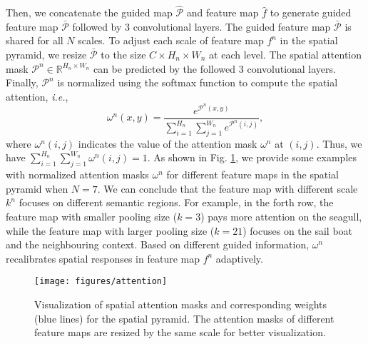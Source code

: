 \documentclass[runningheads]{llncs}
\def\ie{{\em i.e.}}
\begin{document}
Then, we concatenate the guided map $\mathcal{\hat{P}}$ and feature map $\hat{f}$ to generate guided feature map $\mathcal{\bar{P}}$ followed by $3$ convolutional layers. The guided feature map $\mathcal{\bar{P}}$ is shared for all $N$ scales. To adjust each scale of feature map $f^n$ in the spatial pyramid, we resize $\mathcal{\bar{P}}$ to the size $C\times H_{n} \times W_n$ at each level. The spatial attention mask $\mathcal{P}^n \in \mathbb{R}^{H_n \times W_n}$ can be predicted by the followed $3$ convolutional layers. Finally, $\mathcal{P}^n$ is normalized using the softmax function to compute the spatial attention, \ie,
\begin{equation}
\omega^{n}(x, y) = \frac{e^{\mathcal{P}^n(x, y)}}{\sum_{i=1}^{H_n}\sum_{j=1}^{W_n} e^{\mathcal{P}^n(i, j)}},
\end{equation}
where $\omega^{n}(i, j)$ indicates the value of the attention mask $\omega^{n}$ at $(i, j)$. Thus, we have $\sum_{i=1}^{H_n}\sum_{j=1}^{W_n}\omega^n(i, j)=1$.
As shown in Fig. \ref{fig:spatial}, we provide some examples with normalized attention masks $\omega^n$ for different feature maps in the spatial pyramid when $N = 7$. We can conclude that the feature map with different scale $k^n$ focuses on different semantic regions. For example, in the forth row, the feature map with smaller pooling size ($k=3$) pays more attention on the seagull, while the feature map with larger pooling size ($k=21$) focuses on the sail boat and the neighbouring context. Based on different guided information, $\omega^n$ recalibrates spatial responses in feature map $f^n$ adaptively.
\begin{figure}[t]
\centering
\texttt{[image: figures/attention]}
\caption{Visualization of spatial attention masks and corresponding weights (blue lines) for the spatial pyramid. The attention masks of different feature maps are resized by the same scale for better visualization.}
\label{fig:spatial}
\end{figure}
\end{document}
